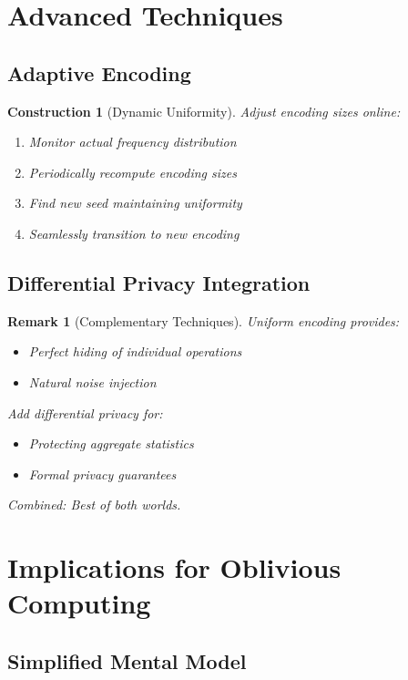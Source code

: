 \documentclass[11pt,final]{article}
\newtheorem{remark}[theorem]{Remark}
\newtheorem{construction}[theorem]{Construction}
\begin{document}
\section{Advanced Techniques}

\subsection{Adaptive Encoding}

\begin{construction}[Dynamic Uniformity]
Adjust encoding sizes online:
\begin{enumerate}
    \item Monitor actual frequency distribution
    \item Periodically recompute encoding sizes
    \item Find new seed maintaining uniformity
    \item Seamlessly transition to new encoding
\end{enumerate}
\end{construction}

\subsection{Differential Privacy Integration}

\begin{remark}[Complementary Techniques]
Uniform encoding provides:
\begin{itemize}
    \item Perfect hiding of individual operations
    \item Natural noise injection
\end{itemize}
Add differential privacy for:
\begin{itemize}
    \item Protecting aggregate statistics
    \item Formal privacy guarantees
\end{itemize}
Combined: Best of both worlds.
\end{remark}

\section{Implications for Oblivious Computing}

\subsection{Simplified Mental Model}
\end{document}
